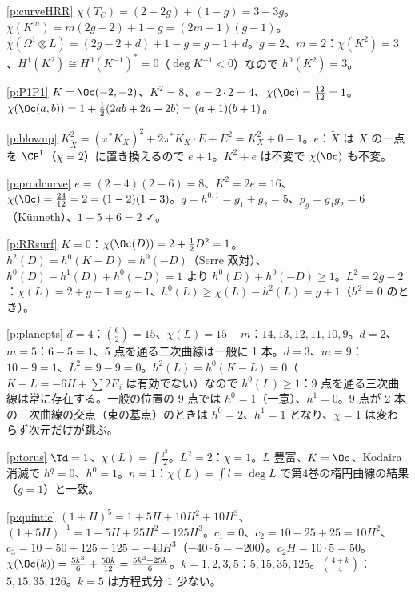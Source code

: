 \begin{sol}{\ref{p:curveHRR}}
$\chi(T_C)=(2-2g)+(1-g)=3-3g$。$\chi(K^m)=m(2g-2)+1-g=(2m-1)(g-1)$。$\chi(\Omega^1\otimes L)=(2g-2+d)+1-g=g-1+d$。$g=2$、$m=2$：$\chi(K^2)=3$、$H^1(K^2)\cong H^0(K^{-1})^*=0$（$\deg K^{-1}<0$）なので $h^0(K^2)=3$。
\end{sol}
\begin{sol}{\ref{p:P1P1}}
$K=\Oc(-2,-2)$、$K^2=8$、$e=2\cdot2=4$、$\chi(\Oc)=\frac{12}{12}=1$。$\chi(\Oc(a,b))=1+\frac12(2ab+2a+2b)=(a+1)(b+1)$。
\end{sol}
\begin{sol}{\ref{p:blowup}}
$K_{\tilde X}^2=(\pi^*K_X)^2+2\pi^*K_X\cdot E+E^2=K_X^2+0-1$。$e$：$\tilde X$ は $X$ の一点を $\CP^1$（$\chi=2$）に置き換えるので $e+1$。$K^2+e$ は不変で $\chi(\Oc)$ も不変。
\end{sol}
\begin{sol}{\ref{p:prodcurve}}
$e=(2-4)(2-6)=8$、$K^2=2e=16$、$\chi(\Oc)=\frac{24}{12}=2=(1-2)(1-3)$。$q=h^{0,1}=g_1+g_2=5$、$p_g=g_1g_2=6$（Künneth）、$1-5+6=2$ ✓。
\end{sol}
\begin{sol}{\ref{p:RRsurf}}
$K=0$：$\chi(\Oc(D))=2+\frac12D^2=1$。$h^2(D)=h^0(K-D)=h^0(-D)$（Serre 双対）、$h^0(D)-h^1(D)+h^0(-D)=1$ より $h^0(D)+h^0(-D)\ge1$。$L^2=2g-2$：$\chi(L)=2+g-1=g+1$、$h^0(L)\ge\chi(L)-h^2(L)=g+1$（$h^2=0$ のとき）。
\end{sol}
\begin{sol}{\ref{p:planepts}}
$d=4$：$\binom62=15$、$\chi(L)=15-m$：$14,13,12,11,10,9$。$d=2$、$m=5$：$6-5=1$、5 点を通る二次曲線は一般に 1 本。$d=3$、$m=9$：$10-9=1$、$L^2=9-9=0$。$h^2(L)=h^0(K-L)=0$（$K-L=-6H+\sum2E_i$ は有効でない）なので $h^0(L)\ge1$：9 点を通る三次曲線は常に存在する。一般の位置の 9 点では $h^0=1$（一意）、$h^1=0$。9 点が 2 本の三次曲線の交点（束の基点）のときは $h^0=2$、$h^1=1$ となり、$\chi=1$ は変わらず次元だけが跳ぶ。
\end{sol}
\begin{sol}{\ref{p:torus}}
$\Td=1$、$\chi(L)=\int\frac{l^2}2$。$L^2=2$：$\chi=1$。$L$ 豊富、$K=\Oc$、Kodaira 消滅で $h^q=0$、$h^0=1$。$n=1$：$\chi(L)=\int l=\deg L$ で第4巻の楕円曲線の結果（$g=1$）と一致。
\end{sol}
\begin{sol}{\ref{p:quintic}}
$(1+H)^5=1+5H+10H^2+10H^3$、$(1+5H)^{-1}=1-5H+25H^2-125H^3$。$c_1=0$、$c_2=10-25+25=10H^2$、$c_3=10-50+125-125=-40H^3$（$-40\cdot5=-200$）。$c_2H=10\cdot5=50$。$\chi(\Oc(k))=\frac{5k^3}6+\frac{50k}{12}=\frac{5k^3+25k}6$。$k=1,2,3,5$：$5,15,35,125$。$\binom{4+k}4$：$5,15,35,126$。$k=5$ は方程式分 $1$ 少ない。
\end{sol}
